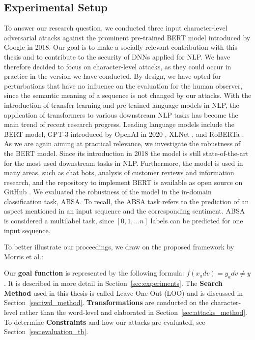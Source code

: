\subsection{Experimental Setup} 
To answer our research question, we conducted three input character-level adversarial attacks against the prominent pre-trained BERT model introduced by Google in 2018. 
Our goal is to make a socially relevant contribution with this thesis and to contribute to the security of DNNs applied for NLP. We have therefore decided to focus on character-level attacks, as they could occur in practice in the version we have conducted. By design, we have opted for perturbations that have no influence on the evaluation for the human observer, since the semantic meaning of a sequence is not changed by our attacks. 
With the introduction of transfer learning and pre-trained language models in NLP, the application of transformers to various downstream NLP tasks has become the main trend of recent research progress. Leading language models include the BERT model, GPT-3 introduced by OpenAI in 2020 \cite{brown2020language}, XLNet \cite{yang2019xlnet}, and RoBERTa \cite{liu2019roberta}. As we are again aiming at practical relevance, we investigate the robustness of the BERT model. Since its introduction in 2018 the model is still state-of-the-art for the most used downstream tasks in NLP. Furthermore, the model is used in many areas, such as chat bots, analysis of customer reviews and information research, and the repository to implement BERT is available as open source on GitHub \cite{tum_2020}.  
We evaluated the robustness of the model in the in-domain classification task, ABSA. To recall, the ABSA task refers to the prediction of an aspect mentioned in an input sequence and the corresponding sentiment. ABSA is considered a multilabel task, since $[0,1, \dots n]$ labels can be predicted for one input sequence. 

To better illustrate our proceedings, we draw on the proposed framework by Morris et al.:

Our \textbf{goal function} is represented by the following formula: ${f( x_adv ) = y_adv \neq y}$. It is described in more detail in Section~\ref{sec:experiments}. The \textbf{Search Method} used in this thesis is called Leave-One-Out (LOO) and is discussed in Section~\ref{sec:iwd_method}. \textbf{Transformations} are conducted on the character-level rather than the word-level and elaborated in Section~\ref{sec:attacks_method}. To determine \textbf{Constraints} and how our attacks are evaluated, see Section~\ref{sec:evaluation_tb}.

